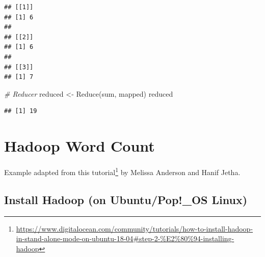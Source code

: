 \documentclass[
  12pt,
]{style/krantz}
\newenvironment{Shaded}{\begin{snugshade}}{\end{snugshade}}
\newcommand{\CommentTok}[1]{\textcolor[rgb]{0.56,0.35,0.01}{\textit{#1}}}
\newcommand{\FunctionTok}[1]{\textcolor[rgb]{0.00,0.00,0.00}{#1}}
\newcommand{\NormalTok}[1]{#1}
\newcommand{\OtherTok}[1]{\textcolor[rgb]{0.56,0.35,0.01}{#1}}
\renewcommand{\href}[2]{#2\footnote{\url{#1}}}
\begin{document}
\begin{verbatim}
## [[1]]
## [1] 6
## 
## [[2]]
## [1] 6
## 
## [[3]]
## [1] 7
\end{verbatim}

\begin{Shaded}
\begin{Highlighting}[]
\CommentTok{\# Reducer}
\NormalTok{reduced }\OtherTok{\textless{}{-}} \FunctionTok{Reduce}\NormalTok{(sum, mapped)}
\NormalTok{reduced}
\end{Highlighting}
\end{Shaded}

\begin{verbatim}
## [1] 19
\end{verbatim}

\hypertarget{hadoop-word-count}{%
\section{Hadoop Word Count}\label{hadoop-word-count}}

Example adapted from \href{https://www.digitalocean.com/community/tutorials/how-to-install-hadoop-in-stand-alone-mode-on-ubuntu-18-04\#step-2-\%E2\%80\%94-installing-hadoop}{this tutorial} by Melissa Anderson and Hanif Jetha.

\hypertarget{install-hadoop-on-ubuntupop_os-linux}{%
\subsection{Install Hadoop (on Ubuntu/Pop!\_OS Linux)}\label{install-hadoop-on-ubuntupop_os-linux}}
\end{document}
